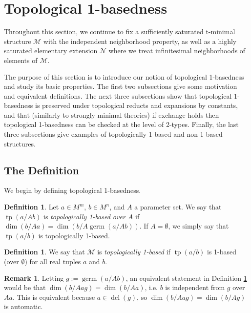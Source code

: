 \documentclass{amsart}
\theoremstyle{definition}
\newtheorem{definition}[theorem]{Definition}
\newtheorem{remark}[theorem]{Remark}
\newcommand{\dcl}{\operatorname{dcl}}
\newcommand{\tp}{\operatorname{tp}}
\begin{document}
\section{Topological 1-basedness}

Throughout this section, we continue to fix a sufficiently saturated t-minimal structure $\mathcal M$ with the independent neighborhood property, as well as a highly saturated elementary extension $\mathcal N$ where we treat infinitesimal neighborhoods of elements of $\mathcal M$.

The purpose of this section is to introduce our notion of topological 1-basedness and study its basic properties. The first two subsections give some motivation and equivalent definitions. The next three subsections show that topological 1-basedness is preserved under topological reducts and expansions by constants, and that (similarly to strongly minimal theories) if exchange holds then topological 1-basedness can be checked at the level of 2-types. Finally, the last three subsections give examples of topologically 1-based and non-1-based structures.

\subsection{The Definition}

We begin by defining topological 1-basedness.

\begin{definition}\label{D: 1-based type}
    Let $a\in M^m$, $b\in M^n$, and $A$ a parameter set. We say that $\tp(a/Ab)$ is \textit{topologically 1-based over $A$} if $\dim(b/Aa)=\dim(b/A\operatorname{germ}(a/Ab))$. If $A=\emptyset$, we simply say that $\tp(a/b)$ is topologically 1-based.
\end{definition}

\begin{definition}\label{D: 1-base}
    We say that $\mathcal M$ is \textit{topologically 1-based} if $\tp(a/b)$ is 1-based (over $\emptyset$) for all real tuples $a$ and $b$.
\end{definition}

\begin{remark}
    Letting $g:=\operatorname{germ}(a/Ab)$, an equivalent statement in Definition \ref{D: 1-based type} would be that $\dim(b/Aag)=\dim(b/Aa)$, i.e. $b$ is independent from $g$ over $Aa$. This is equivalent because $a\in\dcl(g)$, so $\dim(b/Aag)=\dim(b/Ag)$ is automatic.
\end{remark}
\end{document}
